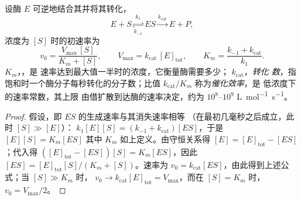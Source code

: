 \begin{theorem}[米氏]\label{thm:b1:enzymes:mm}
设酶 $E$ 可逆地结合其并将其转化，
\[
E + S \underset{k_{-1}}{\overset{k_1}{\rightleftharpoons}} ES
\overset{k_{\text{cat}}}{\longrightarrow} E + P ,
\]
浓度为 $[S]$ 时的初速率为
\[
v_0 = \frac{V_{\max}\,[S]}{K_m + [S]}, \qquad V_{\max} = k_{\text{cat}}\,[E]_{\text{tot}},
\qquad K_m = \frac{k_{-1} + k_{\text{cat}}}{k_1} .
\]
$K_m$，\emph{}，是
速率达到最大值一半时的浓度，它衡量酶需要多少；
$k_{\text{cat}}$，\emph{转化
数}，指
饱和时一个酶分子每秒转化的分子数；比值
$k_{\text{cat}}/K_m$ 称为\emph{催化效率}，是
低浓度下的速率常数，其上限
由借扩散到达酶的速率决定，约为
$10^8$--$10^9$ \unit{L.mol^{-1}.s^{-1}}。
\end{theorem}
\begin{proof}
假设\emph{}，即 $ES$ 的生成速率与其消失速率相等
（在最初几毫秒之后成立，此时 $[S] \gg [E]$）：
$k_1[E][S] = (k_{-1} + k_{\text{cat}})[ES]$，于是 $[E][S] = K_m[ES]$
其中 $K_m$ 如上定义。由守恒关系得 $[E] = [E]_{\text{tot}} -
[ES]$；代入得 $([E]_{\text{tot}} - [ES])[S] = K_m[ES]$，因此
$[ES] = [E]_{\text{tot}}[S]/(K_m + [S])$。速率为
$v_0 = k_{\text{cat}}[ES]$，由此得到上述公式；当 $[S] \gg K_m$ 时，
$v_0 \to k_{\text{cat}}[E]_{\text{tot}} = V_{\max}$，而在 $[S] = K_m$ 时，
$v_0 = V_{\max}/2$。
\end{proof}


